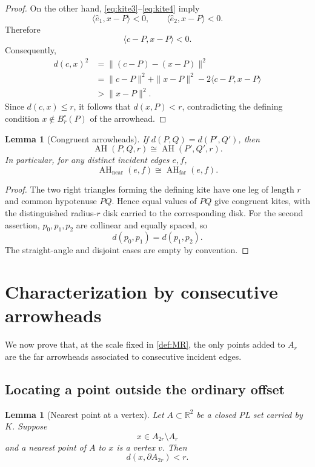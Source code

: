 \documentclass[11pt]{article}
\newtheorem{lemma}[theorem]{Lemma}
\newcommand{\R}{\mathbb R}
\newcommand{\AH}{\operatorname{AH}}
\newcommand{\AHfar}{\operatorname{AH}_{\mathrm{far}}}
\newcommand{\AHnear}{\operatorname{AH}_{\mathrm{near}}}
\numberwithin{equation}{section}
\begin{document}
\begin{proof}
On the other hand, \eqref{eq:kite3}--\eqref{eq:kite4} imply
\[
\langle\widehat e_1,x-P\rangle<0,
\qquad
\langle\widehat e_2,x-P\rangle<0.
\]
Therefore
\[
\langle c-P,x-P\rangle<0.
\]
Consequently,
\[
\begin{aligned}
d(c,x)^2
&=\|(c-P)-(x-P)\|^2\\
&=\|c-P\|^2+\|x-P\|^2-2\langle c-P,x-P\rangle\\
&>\|x-P\|^2.
\end{aligned}
\]
Since $d(c,x)\le r$, it follows that $d(x,P)<r$, contradicting the defining condition $x\notin B_r^\circ(P)$ of the arrowhead.
\end{proof}

\begin{lemma}[Congruent arrowheads]\label{lem:congruent-arrowheads}
If $d(P,Q)=d(P',Q')$, then
\[
\AH(P,Q,r)\cong\AH(P',Q',r).
\]
In particular, for any distinct incident edges $e,f$,
\[
\boxed{\AHnear(e,f)\cong\AHfar(e,f).}
\]
\end{lemma}

\begin{proof}
The two right triangles forming the defining kite have one leg of length $r$ and common hypotenuse $PQ$. Hence equal values of $PQ$ give congruent kites, with the distinguished radius-$r$ disk carried to the corresponding disk. For the second assertion, $p_0,p_1,p_2$ are collinear and equally spaced, so
\[
d(p_0,p_1)=d(p_1,p_2).
\]
The straight-angle and disjoint cases are empty by convention.
\end{proof}
 \section{Characterization by consecutive arrowheads}\label{sec:characterization}

We now prove that, at the scale fixed in \cref{def:MR}, the only points added to $A_r$ are the far arrowheads associated to consecutive incident edges.

\subsection{Locating a point outside the ordinary offset}

\begin{lemma}[Nearest point at a vertex]\label{lem:nearest-vertex}
Let $A\subset\R^2$ be a closed PL set carried by $K$. Suppose
\[
x\in A_{2r}\setminus A_r
\]
and a nearest point of $A$ to $x$ is a vertex $v$. Then
\[
\boxed{d(x,\partial A_{2r})<r.}
\]
\end{lemma}
\end{document}
